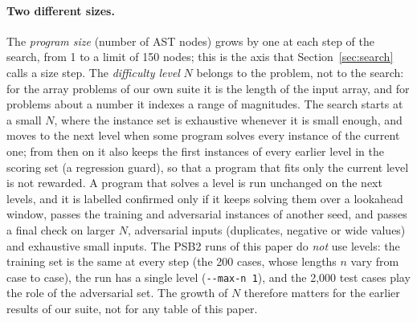 \documentclass[sigconf,nonacm]{acmart}
\begin{document}
\paragraph{Two different sizes.} The \emph{program size} (number of AST nodes) grows by one at each step of the search, from 1 to a limit of 150 nodes; this is the axis that Section~\ref{sec:search} calls a size step.
The \emph{difficulty level} $N$ belongs to the problem, not to the search: for the array problems of our own suite it is the length of the input array, and for problems about a number it indexes a range of magnitudes.
The search starts at a small $N$, where the instance set is exhaustive whenever it is small enough, and moves to the next level when some program solves every instance of the current one; from then on it also keeps the first instances of every earlier level in the scoring set (a regression guard),
so that a program that fits only the current level is not rewarded. A program that solves a level is run unchanged on the next levels, and it is labelled confirmed only if it keeps solving them over a lookahead window, passes the training and adversarial instances of another seed, and passes
a final check on larger $N$, adversarial inputs (duplicates, negative or wide values) and exhaustive small inputs. The PSB2 runs of this paper do \emph{not} use levels: the training set is the same at every step (the 200 cases, whose lengths $n$ vary from case to case), the run has a single level (\texttt{-{}-max-n 1}), and the 2,000 test cases play the role of the adversarial set.
The growth of $N$ therefore matters for the earlier results of our suite, not for any table of this paper.
\end{document}
